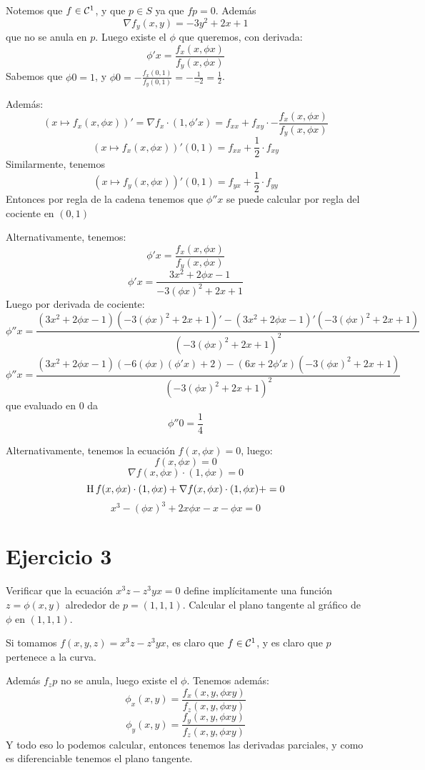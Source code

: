 \documentclass{article}
\begin{document}
Notemos que $f \in \mathcal{C}^1$, y que $p \in S$ ya que $fp = 0$.
Además \[\nabla f_y(x,y) = -3y^2 + 2x + 1\]
que no se anula en $p$.
Luego existe el $\phi$ que queremos, con derivada:
\[
	\phi' x = \frac{f_x(x,\phi x)}{f_y(x,\phi x)}
\]
Sabemos que $\phi 0 = 1$, y $\phi 0 = -\frac{f_x(0,1)}{f_y(0,1)} = -\frac{1}{-2} = \frac{1}{2}$.

Además:
\[
	(x \mapsto f_x(x, \phi x))' = \nabla f_x \cdot (1, \phi' x) = f_{xx} + f_{xy} \cdot -\frac{f_x(x, \phi x)}{f_y(x, \phi x)}
\]
\[
(x \mapsto f_x(x, \phi x))'(0, 1) = f_{xx} + \frac{1}{2} \cdot f_{xy}
\]
Similarmente, tenemos
\[
(x \mapsto f_y(x, \phi x))'(0, 1) = f_{yx} + \frac{1}{2} \cdot f_{yy}
\]
Entonces por regla de la cadena tenemos que $\phi'' x$ se puede calcular por regla del cociente en $(0,1)$

Alternativamente, tenemos:
\[
	\phi' x = \frac{f_x(x,\phi x)}{f_y(x,\phi x)}
\]
\[
	\phi' x = \frac{3x^2 + 2\phi x - 1}{-3(\phi x)^2 + 2x + 1}
\]
Luego por derivada de cociente:
\[
	\phi'' x = \frac{
		(3x^2 + 2\phi x - 1)
	(-3(\phi x)^2 + 2x + 1)' -
	(3x^2 + 2\phi x - 1)'
	(-3(\phi x)^2 + 2x + 1)
}{
(-3(\phi x)^2 + 2x + 1)^2
}
\]
\[
	\phi'' x = \frac{
		(3x^2 + 2\phi x - 1)
		(-6(\phi x)(\phi'x) + 2) -
	(6x + 2\phi' x)
	(-3(\phi x)^2 + 2x + 1)
}{
(-3(\phi x)^2 + 2x + 1)^2
}
\]
que evaluado en $0$ da
\[\phi'' 0 = \frac{1}{4}\]

Alternativamente, tenemos la ecuación $f(x, \phi x) = 0$, luego:
\[
	f(x, \phi x) = 0
\]
\[
	\nabla f(x, \phi x) \cdot (1, \phi x) = 0
\]
\[
	\operatorname{H} f(x, \phi x) \cdot (1, \phi x) +
	\nabla f(x, \phi x) \cdot (1, \phi x) +
	= 0
\]
\[
	x^3 - (\phi x)^3 + 2x\phi x - x - \phi x = 0
\]

\section*{Ejercicio 3}
Verificar que  la ecuación $x^3z - z^3yx = 0$ define implícitamente una función $z = \phi(x,y)$ alrededor de $p = (1,1,1)$. Calcular el plano tangente al gráfico de $\phi$ en $(1,1,1)$.

Si tomamos $f(x,y,z) = x^3z - z^3yx$, es claro que $f \in \mathcal{C}^1$, y es claro que $p$ pertenece a la curva.

Además $f_z p$ no se anula, luego existe el $\phi$. Tenemos además:
\[\phi_x (x,y) = \frac{f_x(x,y, \phi xy)}{f_z(x,y, \phi xy)} \]
\[\phi_y (x,y) = \frac{f_y(x,y, \phi xy)}{f_z(x,y, \phi xy)} \]
Y todo eso lo podemos calcular, entonces tenemos las derivadas parciales, y como es diferenciable tenemos el plano tangente.
\end{document}
